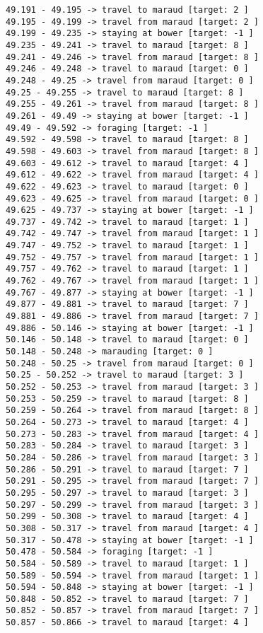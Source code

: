 \documentclass[11pt]{article}
\begin{document}
\begin{Verbatim}[commandchars=\\\{\}]
49.191 - 49.195 -> travel to maraud [target: 2 ]
49.195 - 49.199 -> travel from maraud [target: 2 ]
49.199 - 49.235 -> staying at bower [target: -1 ]
49.235 - 49.241 -> travel to maraud [target: 8 ]
49.241 - 49.246 -> travel from maraud [target: 8 ]
49.246 - 49.248 -> travel to maraud [target: 0 ]
49.248 - 49.25 -> travel from maraud [target: 0 ]
49.25 - 49.255 -> travel to maraud [target: 8 ]
49.255 - 49.261 -> travel from maraud [target: 8 ]
49.261 - 49.49 -> staying at bower [target: -1 ]
49.49 - 49.592 -> foraging [target: -1 ]
49.592 - 49.598 -> travel to maraud [target: 8 ]
49.598 - 49.603 -> travel from maraud [target: 8 ]
49.603 - 49.612 -> travel to maraud [target: 4 ]
49.612 - 49.622 -> travel from maraud [target: 4 ]
49.622 - 49.623 -> travel to maraud [target: 0 ]
49.623 - 49.625 -> travel from maraud [target: 0 ]
49.625 - 49.737 -> staying at bower [target: -1 ]
49.737 - 49.742 -> travel to maraud [target: 1 ]
49.742 - 49.747 -> travel from maraud [target: 1 ]
49.747 - 49.752 -> travel to maraud [target: 1 ]
49.752 - 49.757 -> travel from maraud [target: 1 ]
49.757 - 49.762 -> travel to maraud [target: 1 ]
49.762 - 49.767 -> travel from maraud [target: 1 ]
49.767 - 49.877 -> staying at bower [target: -1 ]
49.877 - 49.881 -> travel to maraud [target: 7 ]
49.881 - 49.886 -> travel from maraud [target: 7 ]
49.886 - 50.146 -> staying at bower [target: -1 ]
50.146 - 50.148 -> travel to maraud [target: 0 ]
50.148 - 50.248 -> marauding [target: 0 ]
50.248 - 50.25 -> travel from maraud [target: 0 ]
50.25 - 50.252 -> travel to maraud [target: 3 ]
50.252 - 50.253 -> travel from maraud [target: 3 ]
50.253 - 50.259 -> travel to maraud [target: 8 ]
50.259 - 50.264 -> travel from maraud [target: 8 ]
50.264 - 50.273 -> travel to maraud [target: 4 ]
50.273 - 50.283 -> travel from maraud [target: 4 ]
50.283 - 50.284 -> travel to maraud [target: 3 ]
50.284 - 50.286 -> travel from maraud [target: 3 ]
50.286 - 50.291 -> travel to maraud [target: 7 ]
50.291 - 50.295 -> travel from maraud [target: 7 ]
50.295 - 50.297 -> travel to maraud [target: 3 ]
50.297 - 50.299 -> travel from maraud [target: 3 ]
50.299 - 50.308 -> travel to maraud [target: 4 ]
50.308 - 50.317 -> travel from maraud [target: 4 ]
50.317 - 50.478 -> staying at bower [target: -1 ]
50.478 - 50.584 -> foraging [target: -1 ]
50.584 - 50.589 -> travel to maraud [target: 1 ]
50.589 - 50.594 -> travel from maraud [target: 1 ]
50.594 - 50.848 -> staying at bower [target: -1 ]
50.848 - 50.852 -> travel to maraud [target: 7 ]
50.852 - 50.857 -> travel from maraud [target: 7 ]
50.857 - 50.866 -> travel to maraud [target: 4 ]

\end{Verbatim}
\end{document}
